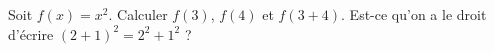 
\begin{exercice}\label{exosmath-0178}

    Soit \( f(x)=x^2\). Calculer \( f(3)\), \( f(4)\) et \( f(3+4)\). Est-ce qu'on a le droit d'écrire \( (2+1)^2=2^2+1^2\) ?

\end{exercice}
